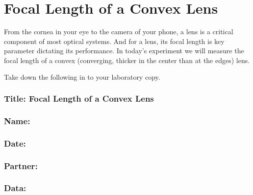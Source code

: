 \documentclass[
  letterpaper,
  DIV=11,
  numbers=noendperiod]{scrreprt}
\begin{document}

\chapter{Focal Length of a Convex
Lens}\label{focal-length-of-a-convex-lens}

From the cornea in your eye to the camera of your phone, a lens is a
critical component of most optical systems. And for a lens, its focal
length is key parameter dictating its performance. In today's experiment
we will measure the focal length of a convex (converging, thicker in the
center than at the edges) lens.

Take down the following in to your laboratory copy.

\subsection*{\texorpdfstring{{Title: Focal Length of a Convex
Lens}}{Title: Focal Length of a Convex Lens}}\label{title-focal-length-of-a-convex-lens}

\subsection*{\texorpdfstring{{Name:}}{Name:}}\label{name-7}

\subsection*{\texorpdfstring{{Date:}}{Date:}}\label{date-7}

\subsection*{\texorpdfstring{{Partner:}}{Partner:}}\label{partner-7}

\subsection*{\texorpdfstring{{Data:}}{Data:}}\label{data-7}
\end{document}
